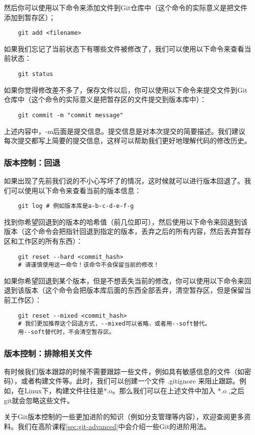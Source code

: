 \documentclass[../main.tex]{subfiles}
\begin{document}
然后你可以使用以下命令来添加文件到Git仓库中（这个命令的实际意义是把文件添加到暂存区）；

\begin{verbatim}
    git add <filename>
\end{verbatim}

如果我们忘记了当前状态下有哪些文件被修改了，我们可以使用以下命令来查看当前状态：
\begin{verbatim}
    git status
\end{verbatim}

如果你觉得修改差不多了，保存文件以后，你可以使用以下命令来提交文件到Git仓库中（这个命令的实际意义是把暂存区的文件提交到版本库中）：

\begin{verbatim}
    git commit -m "commit message"
\end{verbatim}

上述内容中，-m后面是提交信息。提交信息是对本次提交的简要描述。我们建议每次提交都写上简要的提交信息，这样可以帮助我们更好地理解代码的修改历史。

\subsubsection{版本控制：回退}

如果出现了先前我们说的不小心写坏了的情况，这时候就可以进行版本回退了。我们可以使用以下命令来查看当前的版本信息：

\begin{verbatim}
    git log # 例如版本库是a-b-c-d-e-f-g
\end{verbatim}

找到你希望回退到的版本的哈希值（前几位即可），然后使用以下命令来回退到该版本（这个命令会把指针回退到指定的版本，丢弃之后的所有内容，然后丢弃暂存区和工作区的所有东西）：

\begin{verbatim}
    git reset --hard <commit_hash> 
    # 请谨慎使用这一命令！该命令不会保留当前的修改！
\end{verbatim}

如果你希望回退到某个版本，但是不想丢失当前的修改，你可以使用以下命令来回退到该版本（这个命令会把版本库后面的东西全部丢弃，清空暂存区，但是保留当前工作区）：
\begin{verbatim}
    git reset --mixed <commit_hash> 
    # 我们更加推荐这个回退方式，--mixed可以省略，或者用--soft替代。
    用--soft替代时，不会清空暂存区。
\end{verbatim}

\subsubsection{版本控制：排除相关文件}

有时候我们版本跟踪的时候不需要跟踪一些文件，例如具有敏感信息的文件（如密码），或者构建文件等。此时，我们可以创建一个文件 .gitignore 来阻止跟踪。例如，在Linux下，构建文件往往是*.o。那么我们可以在上述文件中加入 *.o ,之后git就会忽略这些文件。

关于Git版本控制的一些更加进阶的知识（例如分支管理等内容），欢迎查阅更多资料。我们在高阶课程\ref{sec:git-advanced}中会介绍一些Git的进阶用法。
\end{document}
